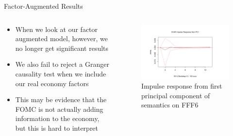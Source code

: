 \documentclass[9pt]{beamer}
\begin{document}
	\begin{frame}{Factor-Augmented Results}
		\begin{columns}
			\begin{column}{0.48\textwidth}
				\begin{itemize}
					\item When we look at our factor augmented model, however, we no longer get significant results
					\item We also fail to reject a Granger causality test when we include our real economy factors
					\item This may be evidence that the FOMC is not actually adding information to the economy, but this is hard to interpret
				\end{itemize}
			\end{column}
			\begin{column}{0.5\textwidth}
				\begin{figure}
					\includegraphics[width=\textwidth]{augmentedimpulse.png}
					\caption{Impulse response from first principal component of semantics on FFF6}
				\end{figure}
			\end{column}
		\end{columns}
	\end{frame}
\end{document}
